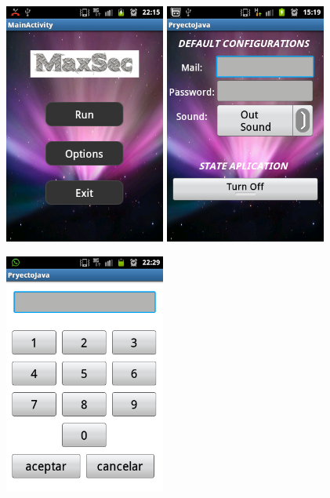\documentclass[12pt,letterpaper]{article}
\begin{document}
\begin{figure}[h]
\includegraphics[width=150pt]{max1.png}\hspace{4cm}
\includegraphics[width=150pt]{max2.png}
\end{figure}
\begin{figure}[h]
\includegraphics[width=150pt]{max3.png}\hspace{4cm}

\end{figure}
\end{document}
